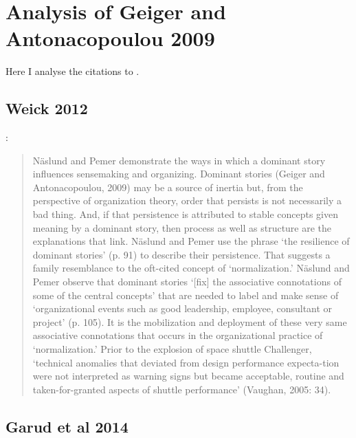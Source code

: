 \section{Analysis of Geiger and Antonacopoulou 2009}

Here I analyse the citations to \cite{geiger2009narratives}.\\

\subsection{Weick 2012}

\citep[pp.143-144]{weick2012organized}:
\begin{quote}
N\"{a}slund  and  Pemer  demonstrate  the  ways  in  which  a  dominant  story  influences sensemaking and organizing. Dominant stories (Geiger and Antonacopoulou, 2009) may be a source of inertia but, from the perspective of organization theory, order that persists is  not  necessarily  a  bad  thing.  And,  if  that  persistence  is  attributed  to  stable  concepts given meaning by a dominant story, then process as well as structure are the explanations that link. N\"{a}slund and Pemer use the phrase ‘the resilience of dominant stories’ (p. 91) to describe their persistence. That suggests a family resemblance to the oft-cited concept of ‘normalization.’ N\"{a}slund and Pemer observe that dominant stories ‘[fix] the associative connotations of some of the central concepts’ that are needed to label and make sense of ‘organizational events such as good leadership, employee, consultant or project’ (p. 105). It is the mobilization and deployment of these very same associative connotations that occurs in the organizational practice of ‘normalization.’ Prior to the explosion of space shuttle Challenger, ‘technical anomalies that deviated from design performance expecta-tion were not interpreted as warning signs but became acceptable, routine and taken-for-granted aspects of shuttle performance’ (Vaughan, 2005: 34).\\
\begin{flushright}
\end{flushright}
\end{quote}

\subsection{Garud et al 2014}

